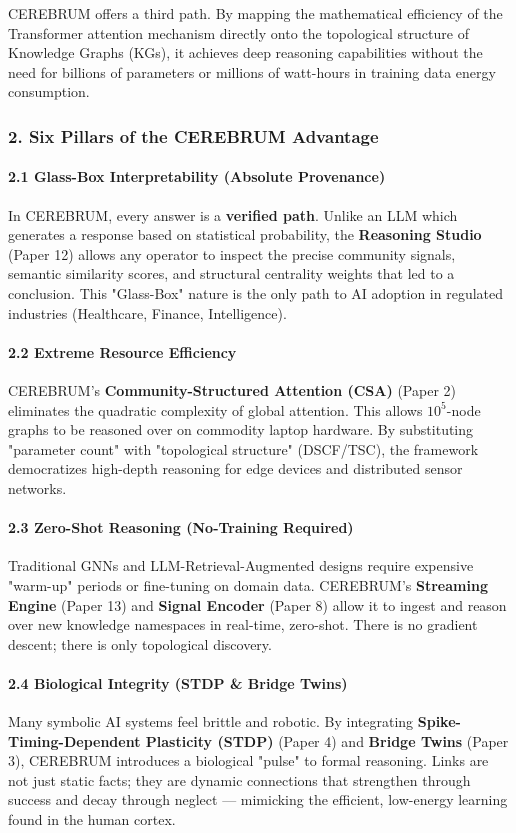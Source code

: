 \documentclass[10pt,journal,compsoc]{IEEEtran}
\begin{document}
CEREBRUM offers a third path. By mapping the mathe\-matical efficiency of the Transformer attention mechanism directly onto the topological structure of Knowledge Graphs (KGs), it achieves deep reasoning capab\-ilities without the need for billions of parameters or millions of watt-hours in training data energy consumption.

\subsubsection{2. Six Pillars of the CEREBRUM Advantage}

\paragraph{2.1 Glass-Box Interp\-retability (Absolute Provenance)}
In CEREBRUM, every answer is a \textbf{verified path}. Unlike an LLM which generates a response based on statistical probability, the \textbf{Reasoning Studio} (Paper 12) allows any operator to inspect the precise community signals, semantic similarity scores, and structural centrality weights that led to a conclusion. This "Glass-Box" nature is the only path to AI adoption in regulated industries (Healthcare, Finance, Intell\-igence).

\paragraph{2.2 Extreme Resource Efficiency}
CEREBRUM's \textbf{Community-Structured Attention (CSA)} (Paper 2) eliminates the quadratic complexity of global attention. This allows $10^5$-node graphs to be reasoned over on commodity laptop hardware. By subst\-ituting "parameter count" with "topological structure" (DSCF/TSC), the framework democ\-ratizes high-depth reasoning for edge devices and distributed sensor networks.

\paragraph{2.3 Zero-Shot Reasoning (No-Training Required)}
Traditional GNNs and LLM-Retrieval-Augmented designs require expensive "warm-up" periods or fine-tuning on domain data. CEREBRUM's \textbf{Streaming Engine} (Paper 13) and \textbf{Signal Encoder} (Paper 8) allow it to ingest and reason over new knowledge namespaces in real-time, zero-shot. There is no gradient descent; there is only topological discovery.

\paragraph{2.4 Biological Integrity (STDP \& Bridge Twins)}
Many symbolic AI systems feel brittle and robotic. By integrating \textbf{Spike-Timing-Dependent Plasticity (STDP)} (Paper 4) and \textbf{Bridge Twins} (Paper 3), CEREBRUM introduces a biological "pulse" to formal reasoning. Links are not just static facts; they are dynamic connections that strengthen through success and decay through neglect — mimicking the efficient, low-energy learning found in the human cortex.
\end{document}
